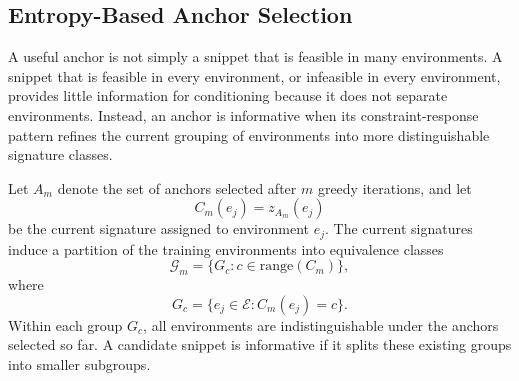 \subsection{Entropy-Based Anchor Selection}

A useful anchor is not simply a snippet that is feasible in many environments. A snippet that is feasible in every environment, or infeasible in every environment, provides little information for conditioning because it does not separate environments. Instead, an anchor is informative when its constraint-response pattern refines the current grouping of environments into more distinguishable signature classes.

Let $A_m$ denote the set of anchors selected after $m$ greedy iterations, and let
%
\begin{equation}
    C_m(e_j)=z_{A_m}(e_j)
\end{equation}
%
be the current signature assigned to environment $e_j$. The current signatures induce a partition of the training environments into equivalence classes
%
\begin{equation}
    \mathcal{G}_m = \{G_c : c \in \mathrm{range}(C_m)\},
\end{equation}
%
where
%
\begin{equation}
    G_c = \{e_j \in \mathcal{E} : C_m(e_j)=c\}.
\end{equation}
%
Within each group $G_c$, all environments are indistinguishable under the anchors selected so far. A candidate snippet is informative if it splits these existing groups into smaller subgroups.


